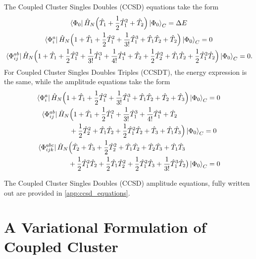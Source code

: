 The Coupled Cluster Singles Doubles (CCSD) equations take the form 
\begin{gather}
    \bra{\Phi_0} \hat{H}_N
        \Big(\hat{T}_1 + \frac{1}{2}\hat{T}_1^2 + \hat{T}_2\Big)
    \ket{\Phi_0}_C = \Delta E \\
    \bra{\Phi^a_i} \hat{H}_N \Big(
        1 + \hat{T}_1 + \frac{1}{2}\hat{T}_1^2 + \frac{1}{3!}\hat{T}_1^3
        + \hat{T}_1\hat{T}_2 + \hat{T}_2
    \Big) \ket{\Phi_0}_C = 0 \\
    \bra*{\Phi^{ab}_{ij}} \hat{H}_N \Big(
        1 + \hat{T}_1 + \frac{1}{2}\hat{T}_1^2 + \frac{1}{3!}\hat{T}_1^3
        + \frac{1}{4!}\hat{T}_1^4 + \hat{T}_2 + \frac{1}{2}\hat{T}_2^2
        + \hat{T}_1 \hat{T}_2 + \frac{1}{2}\hat{T}_1^2 \hat{T}_2
    \Big) \ket{\Phi_0}_C = 0.
\end{gather}
For Coupled Cluster Singles Doubles Triples (CCSDT), the energy expression is the same,
while the amplitude equations take the form 
\begin{gather}
    \bra{\Phi^a_i} \hat{H}_N \Big(
        1 + \hat{T}_1 + \frac{1}{2}\hat{T}_1^2 + \frac{1}{3!}\hat{T}_1^3
        + \hat{T}_1\hat{T}_2 + \hat{T}_2 + \hat{T}_3
    \Big) \ket{\Phi_0}_C = 0 \\
    \begin{aligned}
    \bra*{\Phi^{ab}_{ij}} \hat{H}_N& \Big(
        1 + \hat{T}_1 + \frac{1}{2}\hat{T}_1^2 + \frac{1}{3!}\hat{T}_1^3
        + \frac{1}{4!}\hat{T}_1^4 + \hat{T}_2 \\ &+ \frac{1}{2}\hat{T}_2^2
        + \hat{T}_1 \hat{T}_2 + \frac{1}{2}\hat{T}_1^2 \hat{T}_2
        + \hat{T}_3 + \hat{T}_1\hat{T}_3
    \Big) \ket{\Phi_0}_C = 0  
    \end{aligned} \\
    \begin{aligned}
    \bra*{\Phi^{abc}_{ijk}} \hat{H}_N& \Big(
        \hat{T}_2 + \hat{T}_3 + \frac{1}{2}\hat{T}_2^2 + \hat{T}_1\hat{T}_2
        + \hat{T}_2\hat{T}_3 + \hat{T}_1\hat{T}_3 \\
        &+ \frac{1}{2}\hat{T}_1^2\hat{T}_2 + \frac{1}{2}\hat{T}_1\hat{T}_2^2
        + \frac{1}{2} \hat{T}_1^2\hat{T}_3 + \frac{1}{3!} \hat{T}_1^3 \hat{T}_2
    \big) \ket{\Phi_0}_C = 0  
    \end{aligned}
\end{gather}

The Coupled Cluster Singles Doubles (CCSD) amplitude equations, fully written out are provided
in \autoref{app:ccsd_equations}.

\section{A Variational Formulation of Coupled Cluster}

